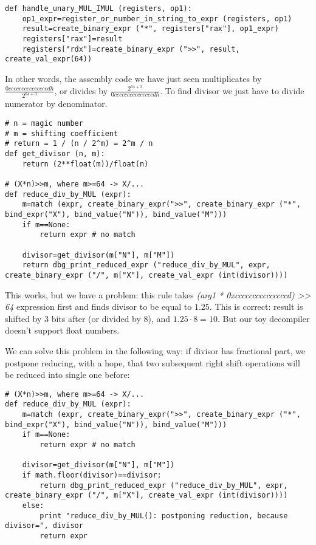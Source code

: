 ﻿\documentclass[12pt]{article}
\begin{document}
\begin{lstlisting}
def handle_unary_MUL_IMUL (registers, op1):
    op1_expr=register_or_number_in_string_to_expr (registers, op1)
    result=create_binary_expr ("*", registers["rax"], op1_expr)
    registers["rax"]=result
    registers["rdx"]=create_binary_expr (">>", result, create_val_expr(64))
\end{lstlisting}

In other words, the assembly code we have just seen multiplicates by {\Large $\frac{0cccccccccccccccdh}{2^{64+3}}$},
or divides by {\Large $\frac{2^{64+3}}{0cccccccccccccccdh}$}.
To find divisor we just have to divide numerator by denominator.

\begin{lstlisting}
# n = magic number
# m = shifting coefficient
# return = 1 / (n / 2^m) = 2^m / n
def get_divisor (n, m):
    return (2**float(m))/float(n)

# (X*n)>>m, where m>=64 -> X/...
def reduce_div_by_MUL (expr):
    m=match (expr, create_binary_expr(">>", create_binary_expr ("*", bind_expr("X"), bind_value("N")), bind_value("M")))
    if m==None:
        return expr # no match
    
    divisor=get_divisor(m["N"], m["M"])
    return dbg_print_reduced_expr ("reduce_div_by_MUL", expr, create_binary_expr ("/", m["X"], create_val_expr (int(divisor))))
\end{lstlisting}

This works, but we have a problem: this rule takes \textit{(arg1 * 0xcccccccccccccccd) >> 64} expression first and
finds divisor to be equal to $1.25$.
This is correct: result is shifted by 3 bits after (or divided by 8), and $1.25 \cdot 8 = 10$.
But our toy decompiler doesn't support float numbers.

We can solve this problem in the following way: if divisor has fractional part, we postpone reducing, with a hope,
that two subsequent right shift operations will be reduced into single one before:

\begin{lstlisting}
# (X*n)>>m, where m>=64 -> X/...
def reduce_div_by_MUL (expr):
    m=match (expr, create_binary_expr(">>", create_binary_expr ("*", bind_expr("X"), bind_value("N")), bind_value("M")))
    if m==None:
        return expr # no match
    
    divisor=get_divisor(m["N"], m["M"])
    if math.floor(divisor)==divisor:
        return dbg_print_reduced_expr ("reduce_div_by_MUL", expr, create_binary_expr ("/", m["X"], create_val_expr (int(divisor))))
    else:
        print "reduce_div_by_MUL(): postponing reduction, because divisor=", divisor
        return expr
\end{lstlisting}
\end{document}
